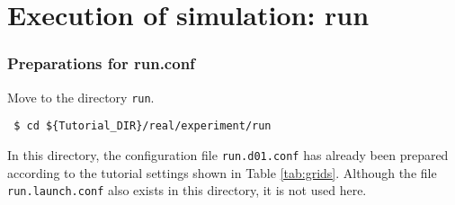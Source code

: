 \section{Execution of simulation: run} \label{sec:tutrial_real_run}
\subsubsection{Preparations for run.conf}
Move to the directory \verb|run|.
\begin{verbatim}
 $ cd ${Tutorial_DIR}/real/experiment/run
\end{verbatim}
In this directory, the configuration file \verb|run.d01.conf| has already been prepared according to the tutorial settings shown in Table \ref{tab:grids}. Although the file \verb|run.launch.conf| also exists in this directory, it is not used here.

